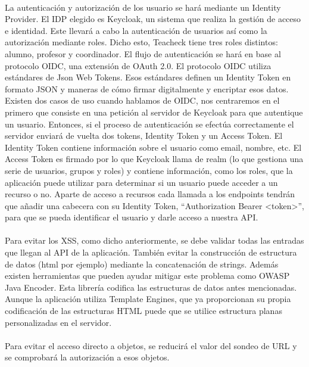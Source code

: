 \paragraph{}
La autenticación y autorización de los usuario se hará mediante un Identity Provider. El IDP elegido es Keycloak, un sistema que realiza la gestión de acceso e identidad. Este llevará a cabo la autenticación de usuarios así como la autorización mediante roles. Dicho esto, Teacheck tiene tres roles distintos: alumno, profesor y coordinador. El flujo de autenticación se hará en base al protocolo OIDC, una extensión de OAuth 2.0. El protocolo OIDC utiliza estándares de Json Web Tokens. Esos estándares definen un Identity Token en formato JSON y maneras de cómo firmar digitalmente y encriptar esos datos. Existen dos casos de uso cuando hablamos de OIDC, nos centraremos en el primero que consiste en una petición al servidor de Keycloak para que autentique un usuario. Entonces, si el proceso de autenticación se efectúa correctamente el servidor enviará de vuelta dos tokens, Identity Token y un Access Token. El Identity Token contiene información sobre el usuario como email, nombre, etc. El Access Token es firmado por lo que Keycloak llama de realm (lo que gestiona una serie de usuarios, grupos y roles) y contiene información, como los roles, que la aplicación puede utilizar para determinar si un usuario puede acceder a un recurso o no. Aparte de acceso a recursos cada llamada a los endpoints tendrán que añadir una cabecera con su Identity Token, “Authorization Bearer <token>”, para que se pueda identificar el usuario y darle acceso a nuestra API.
\paragraph{}
Para evitar los XSS, como dicho anteriormente, se debe validar todas las entradas que llegan al API de la aplicación. También evitar la construcción de estructura de datos (html por ejemplo) mediante la concatenación de strings. Además existen herramientas que pueden ayudar mitigar este problema como OWASP Java Encoder. Esta librería codifica las estructuras de datos antes mencionadas. Aunque la aplicación utiliza Template Engines, que ya proporcionan su propia codificación de las estructuras HTML puede que se utilice estructura planas personalizadas en el servidor. 
\paragraph{}
Para evitar el acceso directo a objetos, se reducirá el valor del sondeo de URL y se comprobará la autorización a esos objetos.
